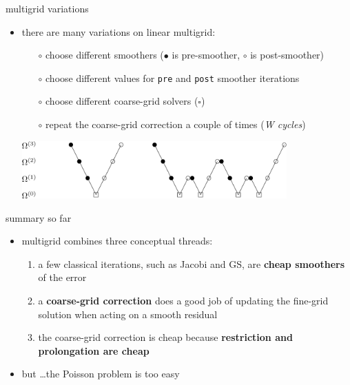 \documentclass[10pt,
               svgnames,
               hyperref={colorlinks,citecolor=DeepPink4,linkcolor=FireBrick,urlcolor=Maroon},
               usepdftitle=false]{beamer}
\begin{document}
\begin{frame}{multigrid variations}
\begin{itemize}
\item there are many variations on linear multigrid:
	\begin{itemize}
	\item[$\circ$] choose different smoothers ({\large $\bullet$} is pre-smoother, {\large $\circ$} is post-smoother)
	\item[$\circ$] choose different values for \texttt{pre} and \texttt{post} smoother iterations
	\item[$\circ$] choose different coarse-grid solvers ($\square$)
	\item[$\circ$] repeat the coarse-grid correction a couple of times (\emph{W cycles})
	\end{itemize}

\bigskip\bigskip
\hfill \includegraphics[width=0.8\textwidth]{images/multigrid-cycles.png}
\end{itemize}
\end{frame}


\begin{frame}{summary so far}
\begin{itemize}
\item multigrid combines three conceptual threads:
\begin{enumerate}
\item a few classical iterations, such as Jacobi and GS, are \textbf{cheap smoothers} of the error
\item a \textbf{coarse-grid correction} does a good job of updating the fine-grid solution when acting on a smooth residual
\item the coarse-grid correction is cheap because \textbf{restriction and prolongation are cheap}
\end{enumerate}

\bigskip
\item<2> but \dots the Poisson problem is too easy
\end{itemize}
\end{frame}
\end{document}
